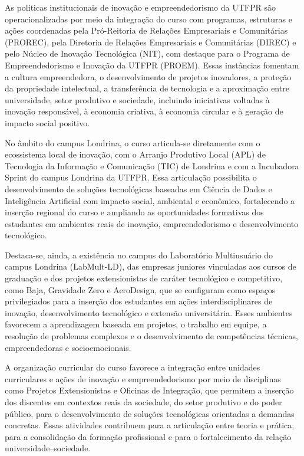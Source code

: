 As políticas institucionais de inovação e empreendedorismo da UTFPR são operacionalizadas por meio da integração do curso com programas, estruturas e ações coordenadas pela Pró-Reitoria de Relações Empresariais e Comunitárias (PROREC), pela Diretoria de Relações Empresariais e Comunitárias (DIREC) e pelo Núcleo de Inovação Tecnológica (NIT), com destaque para o Programa de Empreendedorismo e Inovação da UTFPR (PROEM). Essas instâncias fomentam a cultura empreendedora, o desenvolvimento de projetos inovadores, a proteção da propriedade intelectual, a transferência de tecnologia e a aproximação entre universidade, setor produtivo e sociedade, incluindo iniciativas voltadas à inovação responsável, à economia criativa, à economia circular e à geração de impacto social positivo.

No âmbito do campus Londrina, o curso articula-se diretamente com o ecossistema local de inovação, com o Arranjo Produtivo Local (APL) de Tecnologia da Informação e Comunicação (TIC) de Londrina e com a Incubadora Sprint do campus Londrina da UTFPR. Essa articulação possibilita o desenvolvimento de soluções tecnológicas baseadas em Ciência de Dados e Inteligência Artificial com impacto social, ambiental e econômico, fortalecendo a inserção regional do curso e ampliando as oportunidades formativas dos estudantes em ambientes reais de inovação, empreendedorismo e desenvolvimento tecnológico.

Destaca-se, ainda, a existência no campus do Laboratório Multiusuário do campus Londrina (LabMult-LD), das empresas juniores vinculadas aos cursos de graduação e dos projetos extensionistas de caráter tecnológico e competitivo, como Baja, Gravidade Zero e AeroDesign, que se configuram como espaços privilegiados para a inserção dos estudantes em ações interdisciplinares de inovação, desenvolvimento tecnológico e extensão universitária. Esses ambientes favorecem a aprendizagem baseada em projetos, o trabalho em equipe, a resolução de problemas complexos e o desenvolvimento de competências técnicas, empreendedoras e socioemocionais.

A organização curricular do curso favorece a integração entre unidades curriculares e ações de inovação e empreendedorismo por meio de disciplinas como Projetos Extensionistas e Oficinas de Integração, que permitem a inserção dos discentes em contextos reais da sociedade, do setor produtivo e do poder público, para o desenvolvimento de soluções tecnológicas orientadas a demandas concretas. Essas atividades contribuem para a articulação entre teoria e prática, para a consolidação da formação profissional e para o fortalecimento da relação universidade–sociedade.

